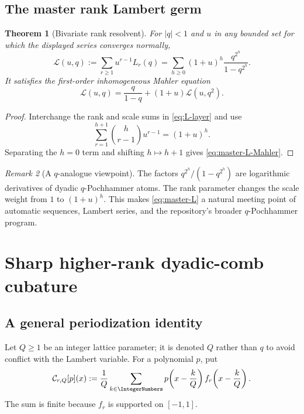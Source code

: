 \documentclass[11pt,oneside]{article}
\newtheorem{theorem}{Theorem}[section]
\theoremstyle{definition}
\theoremstyle{remark}
\newtheorem{remark}[theorem]{Remark}
\begin{document}
\subsection{The master rank Lambert germ}

\begin{theorem}[Bivariate rank resolvent]\label{thm:master-L}
For $|q|<1$ and $u$ in any bounded set for which the displayed series
converges normally,
\begin{equation}\label{eq:master-L}
 \mathscr L(u,q):=\sum_{r\geq1}u^{r-1}L_r(q)
 =\sum_{h\geq0}(1+u)^h\frac{q^{2^h}}{1-q^{2^h}}.
\end{equation}
It satisfies the first-order inhomogeneous Mahler equation
\begin{equation}\label{eq:master-L-Mahler}
 \boxed{\mathscr L(u,q)=\frac{q}{1-q}+(1+u)\mathscr L(u,q^2).}
\end{equation}
\end{theorem}

\begin{proof}
Interchange the rank and scale sums in \eqref{eq:L-layer} and use
\[
 \sum_{r=1}^{h+1}\binom h{r-1}u^{r-1}=(1+u)^h.
\]
Separating the $h=0$ term and shifting $h\mapsto h+1$ gives
\eqref{eq:master-L-Mahler}.
\end{proof}

\begin{remark}[A $q$-analogue viewpoint]
The factors $q^{2^h}/(1-q^{2^h})$ are logarithmic derivatives of dyadic
$q$-Pochhammer atoms.  The rank parameter changes the scale weight from $1$
to $(1+u)^h$.  This makes \eqref{eq:master-L} a natural meeting point of
automatic sequences, Lambert series, and the repository's broader
$q$-Pochhammer program.
\end{remark}

\section{Sharp higher-rank dyadic-comb cubature}

\subsection{A general periodization identity}

Let $Q\geq1$ be an integer lattice parameter; it is denoted $Q$ rather than
$q$ to avoid conflict with the Lambert variable.  For a polynomial $p$, put
\begin{equation}\label{eq:comb}
 \mathcal C_{r,Q}[p](x):=\frac{1}{Q}\sum_{k\in\IntegerNumbers}
 p\!\left(x-\frac{k}{Q}\right)
 f_r\!\left(x-\frac{k}{Q}\right).
\end{equation}
The sum is finite because $f_r$ is supported on $[-1,1]$.
\end{document}
